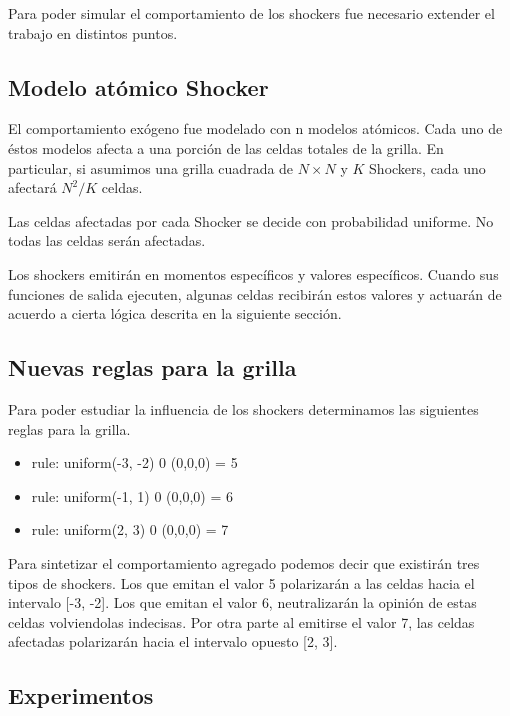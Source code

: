Para poder simular el comportamiento de los shockers fue necesario extender el trabajo en distintos puntos.

\subsection{Modelo atómico Shocker}

El comportamiento exógeno fue modelado con n modelos atómicos. Cada uno de éstos modelos afecta a una porción de las celdas totales de la grilla.
En particular, si asumimos una grilla cuadrada de $N \times N$ y $K$ Shockers, cada uno afectará $N^2/K$ celdas.

Las celdas afectadas por cada Shocker se decide con probabilidad uniforme. No todas las celdas serán afectadas.

Los shockers emitirán en momentos específicos y valores específicos. Cuando sus funciones de salida ejecuten, algunas celdas recibirán estos valores y actuarán de acuerdo a cierta lógica descrita en la siguiente sección.


\subsection{Nuevas reglas para la grilla}

Para poder estudiar la influencia de los shockers determinamos las siguientes reglas para la grilla.

\begin{itemize}
    \item rule: {  uniform(-3, -2) } 0 { (0,0,0) = 5 }
    \item rule: {  uniform(-1, 1)  } 0 { (0,0,0) = 6 }
    \item rule: {  uniform(2, 3) } 0 { (0,0,0) = 7 } 
\end{itemize}

Para sintetizar el comportamiento agregado podemos decir que existirán tres tipos de shockers. Los que emitan el valor 5 polarizarán a las celdas hacia el intervalo [-3, -2]. Los que emitan el valor 6, neutralizarán la opinión de estas celdas volviendolas indecisas. Por otra parte al emitirse el valor 7, las celdas afectadas polarizarán hacia el intervalo opuesto [2, 3].


\subsection{Experimentos}


